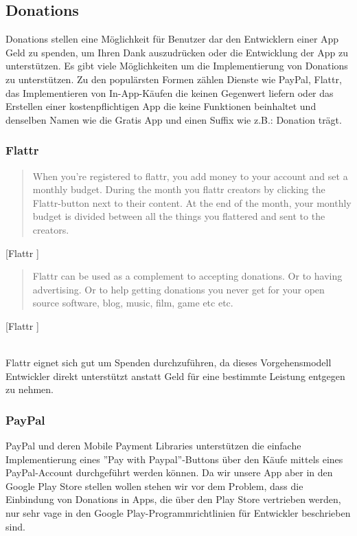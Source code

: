 \documentclass[FIPLY_base.tex]{subfiles}
\author{Andreas Denkmayr}
\date{25. Februar 2016}
\begin{document}
\subsection{Donations}
Donations stellen eine Möglichkeit für Benutzer dar den Entwicklern einer App Geld zu spenden, um Ihren Dank auszudrücken oder die Entwicklung der App zu unterstützen.
Es gibt viele Möglichkeiten um die Implementierung von Donations zu unterstützen.\newline
Zu den populärsten Formen zählen Dienste wie PayPal, Flattr, das Implementieren von In-App-Käufen die keinen Gegenwert liefern oder das Erstellen einer kostenpflichtigen App die keine Funktionen beinhaltet und denselben Namen wie die Gratis App und einen Suffix wie z.B.: Donation trägt.


\subsubsection{Flattr}
\begin{quote}
When you're registered to flattr, you add money to your account and set a monthly budget. During the month you flattr creators by clicking the Flattr-button next to their content. At the end of the month, your monthly budget is divided between all the things you flattered and sent to the creators.
\end{quote}[Flattr \cite{flattr}]

\begin{quote}
Flattr can be used as a complement to accepting donations. Or to having advertising. Or to help getting donations you never get for your open source software, blog, music, film, game etc etc.
\end{quote}[Flattr \cite{flattr}]

\ \\
Flattr eignet sich gut um Spenden durchzuführen, da dieses Vorgehensmodell Entwickler direkt unterstützt anstatt Geld für eine bestimmte Leistung entgegen zu nehmen. 

\newpage
\subsubsection{PayPal}
PayPal und deren Mobile Payment Libraries unterstützen die einfache Implementierung eines ''Pay with Paypal''-Buttons über den Käufe mittels eines PayPal-Account durchgeführt werden können.
Da wir unsere App aber in den Google Play Store stellen wollen stehen wir vor dem Problem, dass die Einbindung von Donations in Apps, die über den Play Store vertrieben werden, nur sehr vage in den Google Play-Programmrichtlinien für Entwickler beschrieben sind.
\end{document}

